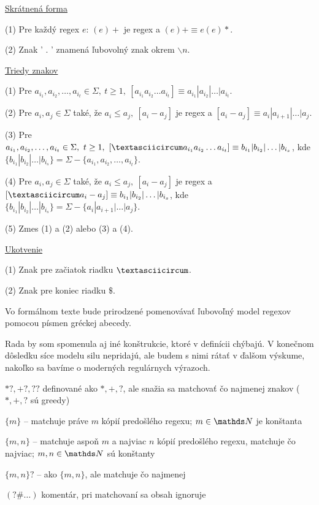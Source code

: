 \underline{Skrátnená forma}
\begin{list}{}{}
\item[(1)] Pre každý regex $e$: $(e)+$ je regex a $(e)+ \equiv e(e)*$.
\item[(2)] Znak ' . ' znamená ľubovolný znak okrem $\backslash n$.
\end{list}

\underline{Triedy znakov}
\begin{list}{}{}
\item[(1)] Pre $a_{i_1},a_{i_2},\dots ,a_{i_t} \in \Sigma,~t \geq 1,~\left[ a_{i_1}a_{i_2}\dots a_{i_t} \right] \equiv a_{i_1}|a_{i_2}|\dots |a_{i_t} $.
\item[(2)] Pre $a_i,a_j \in \Sigma$ také, že $a_i\leq a_j,~ [a_i-a_j]$ je regex a $[a_i-a_j]\equiv a_i|a_{i+1}|\dots |a_j$.
\item[(3)] Pre $a_{i_1},a_{i_2},\dots ,a_{i_t} \in \Sigma,~t \geq 1,~\left[ \textasciicircum a_{i_1}a_{i_2}\dots a_{i_t} \right] \equiv b_{i_1}|b_{i_2}|\dots |b_{i_s} $, kde $\lbrace b_{i_1}|b_{i_2}|\dots |b_{i_s}\rbrace = \Sigma - \lbrace a_{i_1},a_{i_2},\dots ,a_{i_t} \rbrace$.
\item[(4)] Pre $a_i,a_j \in \Sigma$ také, že $a_i\leq a_j,~ [a_i-a_j]$ je regex a $[\textasciicircum a_i-a_j]\equiv b_{i_1}|b_{i_2}|\dots |b_{i_s}$, kde $\lbrace b_{i_1}|b_{i_2}|\dots |b_{i_s}\rbrace = \Sigma - \lbrace a_i|a_{i+1}|\dots |a_j \rbrace$.
\item[(5)] Zmes (1) a (2) alebo (3) a (4).
\end{list}

\underline{Ukotvenie}
\begin{list}{}{}
\item[(1)] Znak pre začiatok riadku $ \textasciicircum $.
\item[(2)] Znak pre koniec riadku $ \mathdollar $.
\end{list}

Vo formálnom texte bude prirodzené pomenovávať ľubovoľný model regexov pomocou písmen gréckej abecedy.

Rada by som spomenula aj iné konštrukcie, ktoré v definícii chýbajú. V konečnom dôsledku síce modelu silu nepridajú, ale budem s nimi rátať v ďalšom výskume, nakoľko sa bavíme o moderných regulárnych výrazoch.

\begin{list}{}{}
\item $*?,+?,??$ definované ako $*,+,?$, ale snažia sa matchovať čo najmenej znakov ($*,+,?$ sú greedy)
\item $\lbrace m \rbrace$ -- matchuje práve $m$ kópií predošlého regexu; $m \in \N$ je konštanta
\item $ \lbrace m,n \rbrace$ -- matchuje aspoň $m$ a najviac $n$ kópií predošlého regexu, matchuje čo najviac; $m, n \in \N$ sú konštanty
\item $ \lbrace m,n \rbrace ?$ -- ako $ \lbrace m,n \rbrace$, ale matchuje čo najmenej
\item $(?\#\dots )$ komentár, pri matchovaní sa obsah ignoruje
\end{list}

